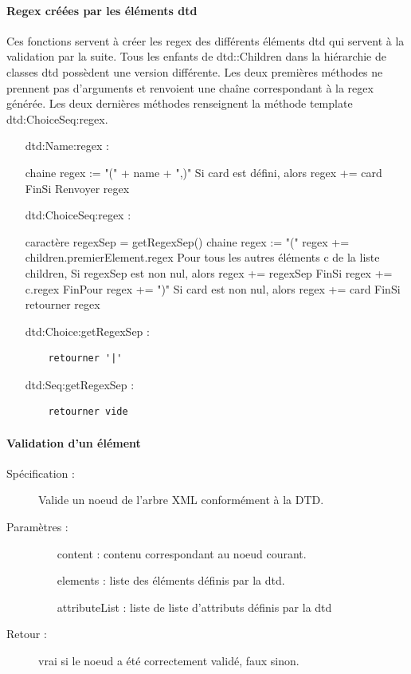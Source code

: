 \documentclass[10pt,a4paper]{article}
\begin{document}
\paragraph{Regex créées par les éléments dtd}
Ces fonctions servent à créer les regex des différents éléments dtd qui servent à la validation par la suite. Tous les enfants de dtd::Children dans la hiérarchie de classes dtd possèdent une version différente. Les deux premières méthodes ne prennent pas d'arguments et renvoient une chaîne correspondant à la regex générée. Les deux dernières méthodes renseignent la méthode template dtd:ChoiceSeq:regex.

\begin{itemize}
\item[dtd:Name:regex] :
\begin{verbatimtab}
	chaine regex := "(" + name + ",)"
	Si card est défini, alors
		regex += card
	FinSi
	Renvoyer regex
\end{verbatimtab}
\item[dtd:ChoiceSeq:regex] :
\begin{verbatimtab}
	caractère regexSep = getRegexSep()
	chaine regex := "("
	regex += children.premierElement.regex
	Pour tous les autres éléments c de la liste children,
		Si regexSep est non nul, alors
			regex += regexSep
		FinSi
		regex += c.regex
	FinPour
	regex += ")"
	Si card est non nul, alors
		regex += card
	FinSi
	retourner regex
\end{verbatimtab}
\item[dtd:Choice:getRegexSep] :
\begin{verbatim}
	retourner '|'
\end{verbatim}
\item[dtd:Seq:getRegexSep] :
\begin{verbatim}
	retourner vide
\end{verbatim}
\end{itemize}

\paragraph{Validation d'un élément}
\begin{description}
\item[Spécification :] Valide un noeud de l’arbre XML conformément à la DTD.
\item[Paramètres :]
\begin{itemize}
\item[content] : contenu correspondant au noeud courant.
\item[elements] : liste des éléments définis par la dtd.
\item[attributeList] : liste de liste d’attributs définis par la dtd
\end{itemize}
\item[Retour :] vrai si le noeud a été correctement validé, faux sinon.
\end{description}
\end{document}
